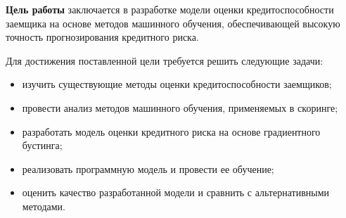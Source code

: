 \textbf{Цель работы} заключается в разработке модели оценки кредитоспособности заемщика на основе методов машинного обучения, обеспечивающей высокую точность прогнозирования кредитного риска.

Для достижения поставленной цели требуется решить следующие задачи:
\begin{itemize}
  \item изучить существующие методы оценки кредитоспособности заемщиков;
  \item провести анализ методов машинного обучения, применяемых в скоринге;
  \item разработать модель оценки кредитного риска на основе градиентного бустинга;
  \item реализовать программную модель и провести ее обучение;
  \item оценить качество разработанной модели и сравнить с альтернативными методами.
\end{itemize}